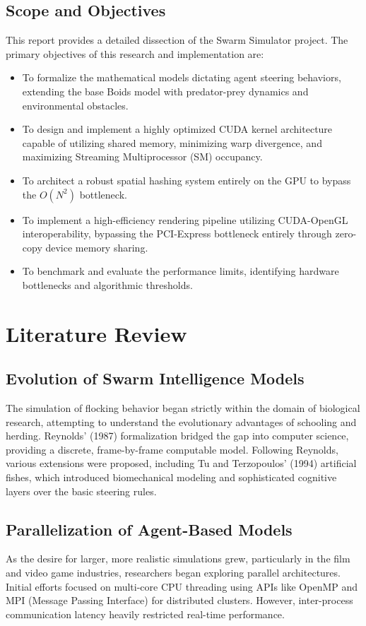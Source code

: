 \documentclass[12pt,a4paper]{report}
\begin{document}
\section{Scope and Objectives}
This report provides a detailed dissection of the Swarm Simulator project. The primary objectives of this research and implementation are:
\begin{itemize}
    \item To formalize the mathematical models dictating agent steering behaviors, extending the base Boids model with predator-prey dynamics and environmental obstacles.
    \item To design and implement a highly optimized CUDA kernel architecture capable of utilizing shared memory, minimizing warp divergence, and maximizing Streaming Multiprocessor (SM) occupancy.
    \item To architect a robust spatial hashing system entirely on the GPU to bypass the $O(N^2)$ bottleneck.
    \item To implement a high-efficiency rendering pipeline utilizing CUDA-OpenGL interoperability, bypassing the PCI-Express bottleneck entirely through zero-copy device memory sharing.
    \item To benchmark and evaluate the performance limits, identifying hardware bottlenecks and algorithmic thresholds.
\end{itemize}

\chapter{Literature Review}
\section{Evolution of Swarm Intelligence Models}
The simulation of flocking behavior began strictly within the domain of biological research, attempting to understand the evolutionary advantages of schooling and herding. Reynolds' (1987) formalization bridged the gap into computer science, providing a discrete, frame-by-frame computable model. Following Reynolds, various extensions were proposed, including Tu and Terzopoulos' (1994) artificial fishes, which introduced biomechanical modeling and sophisticated cognitive layers over the basic steering rules.

\section{Parallelization of Agent-Based Models}
As the desire for larger, more realistic simulations grew, particularly in the film and video game industries, researchers began exploring parallel architectures. Initial efforts focused on multi-core CPU threading using APIs like OpenMP and MPI (Message Passing Interface) for distributed clusters. However, inter-process communication latency heavily restricted real-time performance.
\end{document}
